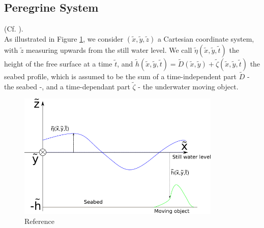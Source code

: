 \documentclass[11pt,a4paper]{article}
\begin{document}
		\subsection{Peregrine System}
			(Cf. \cite{DM2013}).\\ 
			As illustrated in Figure \ref{Coordinates}, we consider $(\tilde{x},\tilde{y},\tilde{z})$ a Cartesian coordinate system, with $\tilde{z}$ measuring upwards from the still water level. We call $\tilde{\eta}(\tilde{x},\tilde{y},\tilde{t})$ the height of the free surface at a time $\tilde{t}$, and $\tilde{h}(\tilde{x},\tilde{y},\tilde{t}) = \tilde{D}(\tilde{x},\tilde{y}) + \tilde{\zeta}(\tilde{x},\tilde{y}, \tilde{t})$ the seabed profile, which is assumed to be the sum of a time-independent part $\tilde{D}$ - the seabed -, and a time-dependant part $\tilde{\zeta}$ - the underwater moving object.
			\begin{figure}[h]
				\centering
				\includegraphics[height=6cm]{CartesianCoordinates.png}
				\caption{Reference}
				\label{Coordinates}
			\end{figure}
			
\end{document}
